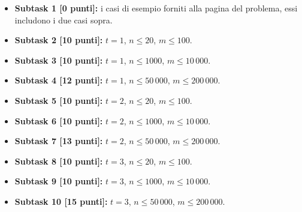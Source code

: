   \begin{itemize}
    \item \textbf{Subtask 1 [0 punti]:} i casi di esempio forniti alla pagina del problema, essi includono i due casi sopra.
    \item \textbf{Subtask 2 [10 punti]:} $t=1$, $n \le 20$, $m \le 100$.
    \item \textbf{Subtask 3 [10 punti]:} $t=1$, $n \le 1000$, $m \le 10\,000$.
    \item \textbf{Subtask 4 [12 punti]:} $t=1$, $n \le 50\,000$, $m \le 200\,000$.
    \item \textbf{Subtask 5 [10 punti]:} $t=2$, $n \le 20$, $m \le 100$.
    \item \textbf{Subtask 6 [10 punti]:} $t=2$, $n \le 1000$, $m \le 10\,000$.
    \item \textbf{Subtask 7 [13 punti]:} $t=2$, $n \le 50\,000$, $m \le 200\,000$.
    \item \textbf{Subtask 8 [10 punti]:} $t=3$, $n \le 20$, $m \le 100$.
    \item \textbf{Subtask 9 [10 punti]:} $t=3$, $n \le 1000$, $m \le 10\,000$.
    \item \textbf{Subtask 10 [15 punti]:} $t=3$, $n \le 50\,000$, $m \le 200\,000$.
  \end{itemize}
  
